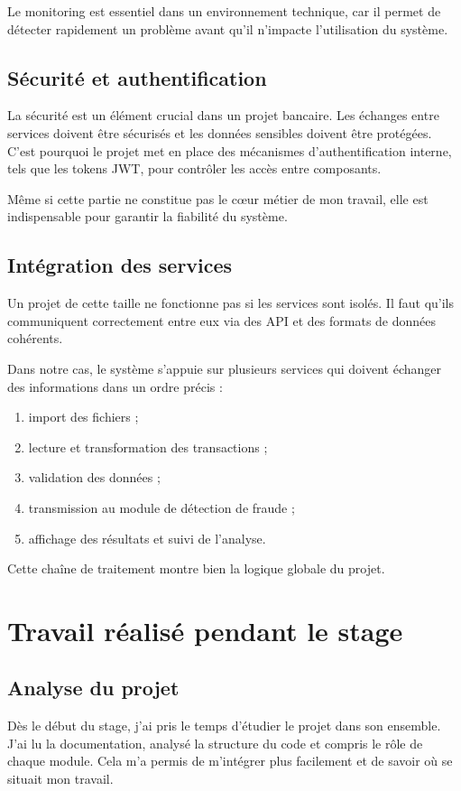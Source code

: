 ﻿\documentclass[12pt,a4paper]{report}
\begin{document}
Le monitoring est essentiel dans un environnement technique, car il permet de détecter rapidement un problème avant qu'il n'impacte l'utilisation du système.

\section{Sécurité et authentification}
La sécurité est un élément crucial dans un projet bancaire. Les échanges entre services doivent être sécurisés et les données sensibles doivent être protégées. C'est pourquoi le projet met en place des mécanismes d'authentification interne, tels que les tokens JWT, pour contrôler les accès entre composants.

Même si cette partie ne constitue pas le cœur métier de mon travail, elle est indispensable pour garantir la fiabilité du système.

\section{Intégration des services}
Un projet de cette taille ne fonctionne pas si les services sont isolés. Il faut qu'ils communiquent correctement entre eux via des API et des formats de données cohérents.

Dans notre cas, le système s'appuie sur plusieurs services qui doivent échanger des informations dans un ordre précis :
\begin{enumerate}[leftmargin=1.8em]
    \item import des fichiers ;
    \item lecture et transformation des transactions ;
    \item validation des données ;
    \item transmission au module de détection de fraude ;
    \item affichage des résultats et suivi de l'analyse.
\end{enumerate}

Cette chaîne de traitement montre bien la logique globale du projet.

\chapter{Travail réalisé pendant le stage}
\section{Analyse du projet}
Dès le début du stage, j'ai pris le temps d'étudier le projet dans son ensemble. J'ai lu la documentation, analysé la structure du code et compris le rôle de chaque module. Cela m'a permis de m'intégrer plus facilement et de savoir où se situait mon travail.
\end{document}
